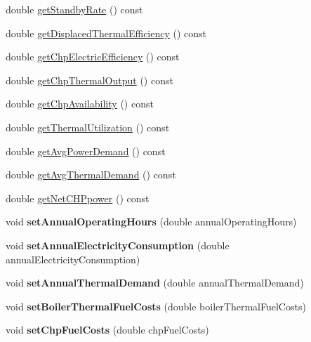 \begin{DoxyCompactItemize}
\item 
double \hyperlink{class_c_h_p_a195f0ffe163404077b56a5e5db8eb59c}{get\+Standby\+Rate} () const
\item 
double \hyperlink{class_c_h_p_a66b1b0e6a0d7f3181b3c1dfb590ab523}{get\+Displaced\+Thermal\+Efficiency} () const
\item 
double \hyperlink{class_c_h_p_a1d38e08a7815211361d334263832cad6}{get\+Chp\+Electric\+Efficiency} () const
\item 
double \hyperlink{class_c_h_p_a13e271f59d6315088416123c6e794e09}{get\+Chp\+Thermal\+Output} () const
\item 
double \hyperlink{class_c_h_p_abd1ea13cd48f5af48799891a52634340}{get\+Chp\+Availability} () const
\item 
double \hyperlink{class_c_h_p_aa27fd9e66e208e6b3f28fdfe182d6c32}{get\+Thermal\+Utilization} () const
\item 
double \hyperlink{class_c_h_p_a79f9a97a010669c5ffed9339c54a36c6}{get\+Avg\+Power\+Demand} () const
\item 
double \hyperlink{class_c_h_p_a5f8975488324e4aa3517c9e01334f4bf}{get\+Avg\+Thermal\+Demand} () const
\item 
double \hyperlink{class_c_h_p_a317f3df613b61f401bc5c4b69fddd0cf}{get\+Net\+C\+H\+Ppower} () const
\item 
\mbox{\label{class_c_h_p_a1b9d3ba01f7e243bcde31bd5fdff9e0a}} 
void {\bfseries set\+Annual\+Operating\+Hours} (double annual\+Operating\+Hours)
\item 
\mbox{\label{class_c_h_p_a306aa3de555bb7dbd79e7aeb1658713e}} 
void {\bfseries set\+Annual\+Electricity\+Consumption} (double annual\+Electricity\+Consumption)
\item 
\mbox{\label{class_c_h_p_aa7abaae6cf4d62059eff750498d70076}} 
void {\bfseries set\+Annual\+Thermal\+Demand} (double annual\+Thermal\+Demand)
\item 
\mbox{\label{class_c_h_p_a13c93cd6b6bba4d52b2f8fd10638724e}} 
void {\bfseries set\+Boiler\+Thermal\+Fuel\+Costs} (double boiler\+Thermal\+Fuel\+Costs)
\item 
\mbox{\label{class_c_h_p_a419c9eaf0ad6009bb3dd753e4b1dd63b}} 
void {\bfseries set\+Chp\+Fuel\+Costs} (double chp\+Fuel\+Costs)
\item 

\end{DoxyCompactItemize}
